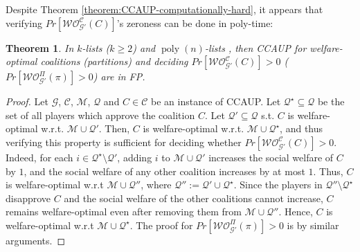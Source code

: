 \documentclass[letterpaper]{article} %
\newtheorem{theorem}{Theorem}
\newtheorem{remark}{Remark}
\DeclareMathOperator*{\poly}{poly}
\begin{document}

Despite Theorem \ref{theorem:CCAUP-computationally-hard}, it appears that verifying $Pr[\mathcal{WO}^{\mathcal{C}}_{\mathcal{G}'}(C)]$'s zeroness can be done in poly-time:
\begin{theorem}
\label{theorem:zeroness}
In $k$-lists ($k \geq 2$) and $\poly(n)$-lists%
, then CCAUP for welfare-optimal coalitions (partitions) and deciding $Pr[\mathcal{WO}^{\mathcal{C}}_{\mathcal{G}'}(C)] > 0$ ($Pr[\mathcal{WO}^{\Pi}_{\mathcal{G}'}(\pi)] > 0$) are in FP.
\end{theorem}
\begin{proof}
Let $\mathcal{G}$, $\mathcal{C}$, $\mathcal{M}$, $\mathcal{Q}$ and $C \in \mathcal{C}$ be an instance of CCAUP. Let $\mathcal{Q}^\star \subseteq \mathcal{Q}$ be the set of all players which approve the coalition $C$. Let $\mathcal{Q}' \subseteq \mathcal{Q}$ s.t. $C$ is welfare-optimal w.r.t. $\mathcal{M} \cup \mathcal{Q}'$. Then, $C$ is welfare-optimal w.r.t. $\mathcal{M} \cup \mathcal{Q}^\star$, and thus verifying this property is sufficient for deciding whether $Pr[\mathcal{WO}^{\mathcal{C}}_{\mathcal{G}'}(C)] > 0$. Indeed, for each $i \in \mathcal{Q}^\star \setminus \mathcal{Q}'$, adding $i$ to $\mathcal{M} \cup \mathcal{Q}'$ increases the social welfare of $C$ by $1$, and the social welfare of any other coalition increases by at most $1$. Thus, $C$ is welfare-optimal w.r.t $\mathcal{M} \cup \mathcal{Q}''$, where $  \mathcal{Q}'' := \mathcal{Q}' \cup \mathcal{Q}^\star$. Since the players in $ \mathcal{Q}'' \setminus  \mathcal{Q}^\star$ disapprove $C$ and the social welfare of the other coalitions cannot increase, $C$ remains welfare-optimal even after removing them from $\mathcal{M} \cup \mathcal{Q}''$. Hence, $C$ is welfare-optimal w.r.t $\mathcal{M} \cup \mathcal{Q}^\star$. The proof for $Pr[\mathcal{WO}^{\Pi}_{\mathcal{G}'}(\pi)] > 0$ is by similar arguments.
\end{proof}
\end{document}
